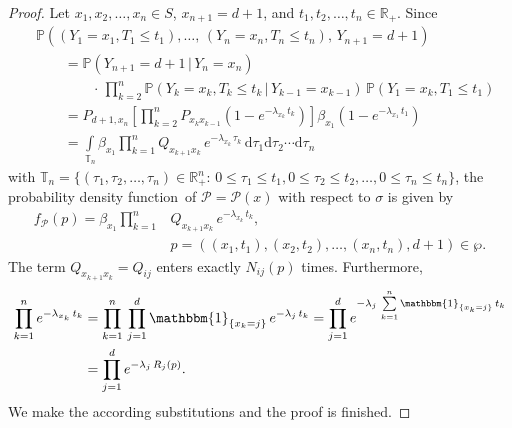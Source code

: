 \documentclass[smallextended]{svjour3}
\newcommand{\R}{\mathbb{R}}
\renewcommand{\P}{\mathbb{P}}
\newcommand{\suml}{\sum\limits}
\newcommand{\prodl}{\prod\limits}
\newcommand{\intl}{\int\limits}
\newcommand{\pdf}{probability density function}
\begin{document}
\begin{proof}
	Let $x_1,x_2,\ldots,x_n\in S$, $x_{n+1}=d+1$, and $t_1,t_2,\ldots,t_n\in\R_+$.
	Since
	\begin{equation}
    \begin{aligned}
      &\P((Y_1=x_1,T_1\leq t_1),\ldots,\,(Y_n=x_n,T_n\leq t_n),\, Y_{n+1}=d+1) \\
      &\qquad= \P(Y_{n+1}=d+1\,|\,Y_n=x_n)\\
      &\qquad\qquad\cdot\,\prodl_{k=2}^n \P(Y_k=x_k,T_k\leq t_k\,|\,Y_{k-1}=x_{k-1})\,\P(Y_1=x_k,T_1\leq t_1)\\
      &\qquad= P_{d+1,x_n}\left[\prodl_{k=2}^n P_{x_{k} x_{k-1}}\left(1-e^{-\lambda_{x_k}\,t_k}\right)\right] \beta_{x_1}\left(1-e^{-\lambda_{x_1}\,t_1}\right)\\
      &\qquad= \intl_{\mathbb{T}_n} \beta_{x_1}\prodl_{k=1}^n Q_{x_{k+1}x_k}\,e^{-\lambda_{x_k}\,\tau_k}\,\mathrm{d}\tau_1\mathrm{d}\tau_2\cdots\mathrm{d}\tau_n
    \end{aligned}
  \end{equation}
	with $\mathbb{T}_n=\{(\tau_1,\tau_2,\ldots,\tau_n)\in\R^n_+:\,0\leq\tau_1\leq t_1,0\leq\tau_2\leq t_2,\ldots,0\leq\tau_n\leq t_n\}$,
	the \pdf\ of $\mathcal{P}=\mathcal{P}(x)$ with respect to $\sigma$ is given by
	\begin{equation}
    \begin{aligned}
      f_{\mathcal{P}}(p) = \beta_{x_1}\prodl_{k=1}^n &Q_{x_{k+1}x_k}\,e^{-\lambda_{x_k}\,t_k},\\
      & p=((x_1,t_1),(x_2,t_2),\ldots,(x_n,t_n),d+1)\in\wp.
    \end{aligned}
  \end{equation}
	The term $Q_{x_{k+1}x_k}=Q_{ij}$ enters exactly $N_{ij}(p)$ times.
	Furthermore,
	\begin{equation}
    \begin{aligned}
      \prodl_{k=1}^n e^{-\lambda_{x_k}\,t_k} &= \prodl_{k=1}^n\,\prodl_{j=1}^d \mathbbm{1}_{\{x_k=j\}}\,e^{-\lambda_j\,t_k}
      = \prodl_{j=1}^d e^{-\lambda_j\,\suml_{k=1}^n \mathbbm{1}_{\{x_k=j\}}\,t_k}\\
      &= \prodl_{j=1}^d e^{-\lambda_j\,R_j(p)}.
    \end{aligned}
  \end{equation}
	We make the according substitutions and the proof is finished.
\end{proof}
\end{document}

